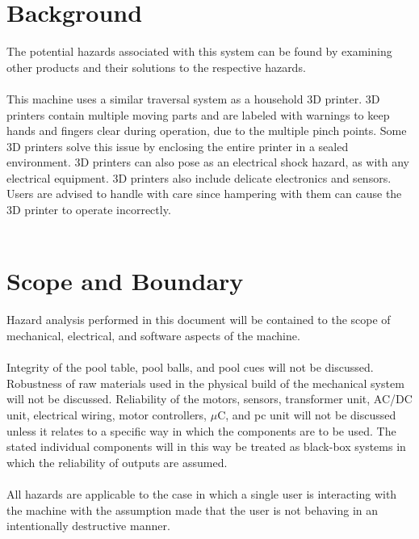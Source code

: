 \documentclass[titlepage]{article}
\begin{document}
\section{Background}
The potential hazards associated with this system can be found by examining other products and their solutions to the respective hazards.\\~\\
This machine uses a similar traversal system as a household 3D printer. 3D printers contain multiple moving parts and are labeled with warnings to keep hands and fingers clear during operation, due to the multiple pinch points. Some 3D printers solve this issue by enclosing the entire printer in a sealed environment. 3D printers can also pose as an electrical shock hazard, as with any electrical equipment. 3D printers also include delicate electronics and sensors. Users are advised to handle with care since hampering with them can cause the 3D printer to operate incorrectly.\\~\\

\section{Scope and Boundary}
Hazard analysis performed in this document will be contained to the scope of mechanical, electrical, and software aspects of the machine.\\~\\
Integrity of the pool table, pool balls, and pool cues will not be discussed. Robustness of raw materials used in the physical build of the mechanical system will not be discussed. Reliability of the motors, sensors, transformer unit, AC/DC unit, electrical wiring, motor controllers, $\mu$C, and pc unit will not be discussed unless it relates to a specific way in which the components are to be used. The stated individual components will in this way be treated as black-box systems in which the reliability of outputs are assumed.\\~\\
All hazards are applicable to the case in which a single user is interacting with the machine with the assumption made that the user is not behaving in an intentionally destructive manner.

\newpage
\end{document}
